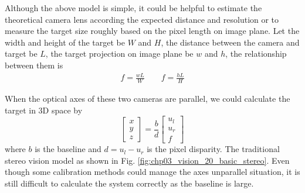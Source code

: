 %

Although the above model is simple, it could be helpful to estimate the theoretical camera lens according the expected distance and resolution or to measure the target size roughly based on the pixel length on image plane. Let the width and height of the target be $W$ and $H$, the distance between the camera and target be $L$, the target projection on image plane be $w$ and $h$, the relationship between them is  
\begin{align}
f=\frac{wL}{W} \qquad f=\frac{hL}{H}
\end{align}

When the optical axes of these two cameras are parallel, we could calculate the target in 3D space by
\begin{equation}
\left[ {\begin{array}{*{20}{c}}
	x \\ 
	y \\ 
	z 
	\end{array}} \right] =\frac{b}{d} \left[ {\begin{array}{*{20}{c}}
	u_l \\ 
	u_r \\ 
	f 
	\end{array}} \right]
\end{equation}
where $b$ is the baseline and $d=u_l-u_r$ is the pixel disparity. The traditional stereo vision model as shown in Fig. \ref{fig:chp03_vision_20_basic_stereo}. Even though some calibration methods could manage the axes unparallel situation, it is still difficult to calculate the system correctly as the baseline is large.

